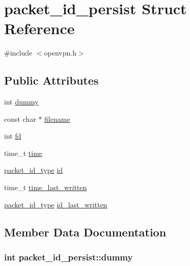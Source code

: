 \hypertarget{structpacket__id__persist}{}\section{packet\+\_\+id\+\_\+persist Struct Reference}
\label{structpacket__id__persist}


{\ttfamily \#include $<$openvpn.\+h$>$}

\subsection*{Public Attributes}
\begin{DoxyCompactItemize}
\item 
int \hyperlink{structpacket__id__persist_a1c190653c39f53937045152957b9f588}{dummy}
\item 
const char $\ast$ \hyperlink{structpacket__id__persist_a4d627c299051f13bd6c8ae411ae89341}{filename}
\item 
int \hyperlink{structpacket__id__persist_a29b5a87745bca60a862adacfa2575e20}{fd}
\item 
time\+\_\+t \hyperlink{structpacket__id__persist_a6a50cf58f68f2ef173fa45abe4f68691}{time}
\item 
\hyperlink{packet__id_8h_a345f753b1c6ea20d24409e769aadb7e6}{packet\+\_\+id\+\_\+type} \hyperlink{structpacket__id__persist_a8a83632838fc417748dd4a2b9a3097a0}{id}
\item 
time\+\_\+t \hyperlink{structpacket__id__persist_aa07c048d293b427bc65166965bf8f6df}{time\+\_\+last\+\_\+written}
\item 
\hyperlink{packet__id_8h_a345f753b1c6ea20d24409e769aadb7e6}{packet\+\_\+id\+\_\+type} \hyperlink{structpacket__id__persist_a6376160e9bab727146ec88c6e80e1fc8}{id\+\_\+last\+\_\+written}
\end{DoxyCompactItemize}


\subsection{Member Data Documentation}
\hypertarget{structpacket__id__persist_a1c190653c39f53937045152957b9f588}{}
\subsubsection[{dummy}]{\setlength{\rightskip}{0pt plus 5cm}int packet\+\_\+id\+\_\+persist\+::dummy}\label{structpacket__id__persist_a1c190653c39f53937045152957b9f588}
\hypertarget{structpacket__id__persist_a29b5a87745bca60a862adacfa2575e20}{}
